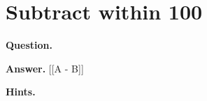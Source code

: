 \documentclass{article}
\begin{document}
\section*{Subtract within 100}
\textbf{Question.} 

\textbf{Answer.} [[A - B]]

\textbf{Hints.}
\begin{itemize}

\end{itemize}
\end{document}
